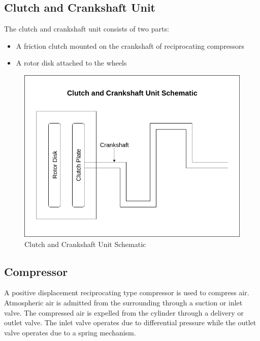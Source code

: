 \documentclass[12pt,a4paper]{article}
\begin{document}
	\subsection{Clutch and Crankshaft Unit}
		The clutch and crankshaft unit consists of two parts:

		\begin{itemize}
			\item A friction clutch mounted on the crankshaft of reciprocating compressors
			\item A rotor disk attached to the wheels
		\end{itemize}

		\begin{figure}[H]
			\centering
			\includegraphics[width=1\textwidth]{images/clutch-and-crankshaft-unit-schematic.png}
			\caption{Clutch and Crankshaft Unit Schematic}
			\label{fig:clutch_and_crankshaft_unit_schematic}
		\end{figure}

	\subsection{Compressor}
		A positive displacement reciprocating type compressor is used to compress air. Atmospheric air is admitted from the surrounding through a suction or inlet valve. The compressed air is expelled from the cylinder through a delivery or outlet valve. The inlet valve operates due to differential pressure while the outlet valve operates due to a spring mechanism.
\end{document}
